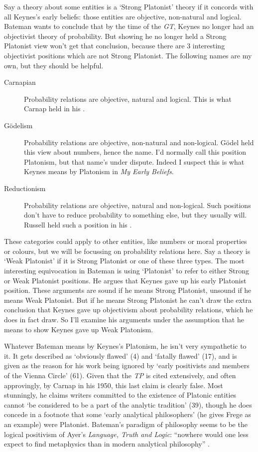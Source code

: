 Say a theory about some entities is a `Strong Platonist' theory if it concords with all Keynes's early beliefs: those entities are objective, non-natural and logical. Bateman wants to conclude that by the time of the \textit{GT}, Keynes no longer had an objectivist theory of probability. But showing he no longer held a Strong Platonist view won't get that conclusion, because there are 3 interesting objectivist positions which are not Strong Platonist. The following names are my own, but they should be helpful.

\begin{description}
\item[Carnapian] Probability relations are objective, natural and logical. This is what Carnap held in his \citeyear{Carnap1950}.
\item[G\"odelism] Probability relations are objective, non-natural and non-logical. G\"{o}del held this view about numbers, hence the name. I'd normally call this position Platonism, but that name's under dispute. Indeed I suspect this is what Keynes means by Platonism in \textit{My Early Beliefs}. \citep{KeynesMEB}
\item[Reductionism] Probability relations are objective, natural and non-logical. Such positions don't have to reduce probability to something else, but they usually will. Russell held such a position in his \citeyear{Russell1948}.
\end{description}

\noindent These categories could apply to other entities, like numbers or moral properties or colours, but we will be focussing on probability relations here. Say a theory is `Weak Platonist' if it is Strong Platonist or one of these three types. The most interesting equivocation in Bateman is using `Platonist' to refer to either Strong or Weak Platonist positions. He argues that Keynes gave up his early Platonist position. These arguments are sound if he means Strong Platonist, unsound if he means Weak Platonist. But if he means Strong Platonist he can't draw the extra conclusion that Keynes gave up objectivism about probability relations, which he does in fact draw. So I'll examine his arguments under the assumption that he means to show Keynes gave up Weak Platonism.

Whatever Bateman means by Keynes's Platonism, he isn't very sympathetic to it. It gets described as `obviously flawed' (4) and `fatally flawed' (17), and is given as the reason for his work being ignored by `early positivists and members of the Vienna Circle' (61). Given that the \textit{TP} is cited extensively, and often approvingly, by Carnap in his 1950, this last claim is clearly false. Most stunningly, he claims writers committed to the existence of Platonic entities cannot `be considered to be a part of the analytic tradition' (39), though he does concede in a footnote that some `early analytical philosophers' (he gives Frege as an example) were Platonist. Bateman's paradigm of philosophy seems to be the logical positivism of Ayer's \textit{Language, Truth and Logic}: ``nowhere would one less expect to find metaphysics than in modern analytical philosophy'' \citep[39]{Ayer1936}.

